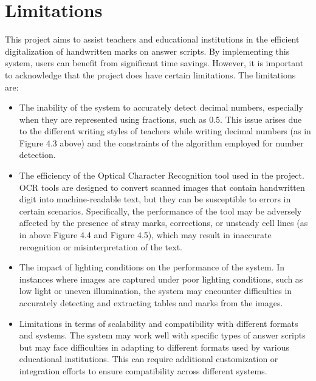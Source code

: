\section{Limitations}

This project aims to assist teachers and educational institutions in the efficient digitalization of handwritten marks on answer scripts. By implementing this system, users can benefit from significant time savings. However, it is important to acknowledge that the project does have certain limitations. The limitations are:

\begin{itemize}
    \item The inability of the system to accurately detect decimal numbers, especially when they are represented using fractions, such as 0.5. This issue arises due to the different writing styles of teachers while writing decimal numbers (as in Figure 4.3 above) and the constraints of the algorithm employed for number detection.

    \item The efficiency of the Optical Character Recognition tool used in the project. OCR tools are designed to convert scanned images that contain handwritten digit into machine-readable text, but they can be susceptible to errors in certain scenarios. Specifically, the performance of the tool may be adversely affected by the presence of stray marks, corrections, or unsteady cell lines (as in above Figure 4.4 and Figure 4.5), which may result in inaccurate recognition or misinterpretation of the text.
    
    \item The impact of lighting conditions on the performance of the system. In instances where images are captured under poor lighting conditions, such as low light or uneven illumination, the system may encounter difficulties in accurately detecting and extracting tables and marks from the images.

    \item Limitations in terms of scalability and compatibility with different formats and systems. The system may work well with specific types of answer scripts but may face difficulties in adapting to different formats used by various educational institutions. This can require additional customization or integration efforts to ensure compatibility across different systems.
\end{itemize} 